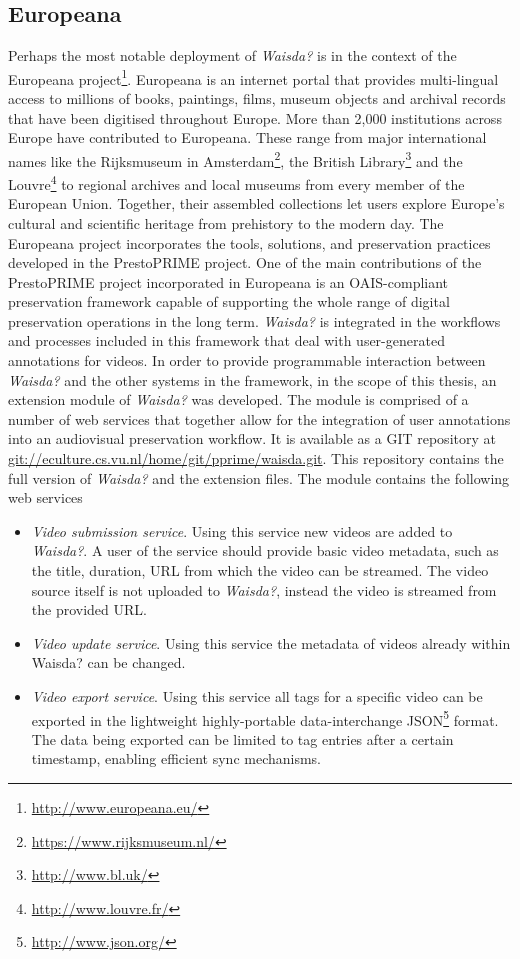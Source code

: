 \subsection{Europeana}\label{sec:waisda-europeana}
Perhaps the most notable deployment of \textit{Waisda?} is in the context of the Europeana project\footnote{\url{http://www.europeana.eu/}}. Europeana is an internet portal that provides multi-lingual access to millions of books, paintings, films, museum objects and archival records that have been digitised throughout Europe. More than 2,000 institutions across Europe have contributed to Europeana. These range from major international names like the Rijksmuseum in Amsterdam\footnote{\url{https://www.rijksmuseum.nl/}}, the British Library\footnote{\url{http://www.bl.uk/}} and the Louvre\footnote{\url{http://www.louvre.fr/}} to regional archives and local museums from every member of the European Union. Together, their assembled collections let users explore Europe's cultural and scientific heritage from prehistory to the modern day. The Europeana project incorporates the tools, solutions, and preservation practices developed in the PrestoPRIME project. One of the main contributions of the PrestoPRIME project incorporated in Europeana is an OAIS-compliant preservation framework capable of supporting the whole range of digital preservation operations in the long term. \textit{Waisda?} is integrated in the workflows and processes included in this framework that deal with user-generated annotations for videos. In order to provide programmable interaction between \textit{Waisda?} and the other systems in the framework, in the scope of this thesis, an extension module of \textit{Waisda?} was developed. The module is comprised of a number of web services that together allow for the integration of user annotations into an audiovisual preservation workflow. It is available as a GIT repository at \url{git://eculture.cs.vu.nl/home/git/pprime/waisda.git}. This repository contains the full version of \textit{Waisda?} and the extension files. The module contains the following web services
\begin{itemize}
\item \textit{Video submission service}. Using this service new videos are added to \textit{Waisda?}. A user of the service should provide basic video metadata, such as the title, duration, URL from which the video can be streamed. The video source itself is not uploaded to \textit{Waisda?}, instead the video is streamed from the provided URL.

\item \textit{Video update service}. Using this service the metadata of videos already within Waisda? can be changed.

\item \textit{Video export service}. Using this service all tags for a specific video can be exported in the lightweight highly-portable data-interchange JSON\footnote{\url{http://www.json.org/}} format. The data being exported can be limited to tag entries after a certain timestamp, enabling efficient sync mechanisms.
\end{itemize}

